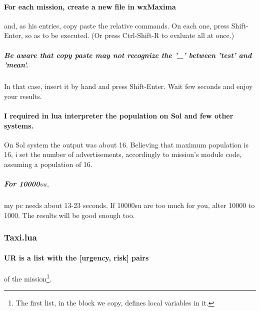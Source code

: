 \documentclass[]{article}
\begin{document}
\paragraph*{For each mission, create a new file in wxMaxima} and, as his entries, copy paste the relative commands. On each one, press Shift-Enter, so as to be executed. (Or press Ctrl-Shift-R to evaluate all at once.)
\subparagraph*{Be aware that copy paste may not recognize the '\_' between 'test' and 'mean'.} In that case, insert it by hand  and press Shift-Enter. Wait few seconds and enjoy your results.
\paragraph*{I required in lua interpreter the population on Sol and few other systems.} On Sol system the output was about 16. Believing that maximum population is 16, i set the number of advertisements, accordingly to mission's module code, assuming a population of 16.
\subparagraph*{For 10000$su,$} my pc needs about 13-23 seconds. If 10000su are too much for you, alter 10000 to 1000. The results will be good enough too.
\subsubsection{Taxi.lua}
\paragraph*{UR is a list with the [urgency, risk]  pairs} of the mission\footnote{The first list, in the block we copy, defines local variables in it.}.
\end{document}
